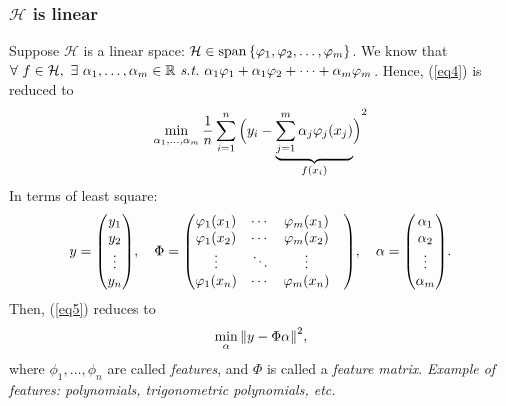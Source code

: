 \subsubsection*{$\mathcal{H}$ is linear}
Suppose $\mathcal{H}$ is a linear space: $\mathcal{H}\in\operatorname{span}\qty{\varphi_1,\varphi_2,\dots,\varphi_m}$. We know that $\forall\ f\in\mathcal{H},\ \exists\ \alpha_1,\dots,\alpha_m\in\R\st \alpha_1\phi_1+\alpha_1\phi_2+\cdots+\alpha_m\phi_m$. Hence, (\ref{eq4}) is reduced to \begin{equation}\label{eq5}\min_{\alpha_1,\dots,\alpha_m}\dfrac{1}{n}\sum_{i=1}^n\qty\Big(y_i-\underbrace{\sum_{j=1}^m\alpha_j\varphi_j(x_j)}_{f(x_i)})^2\end{equation} In terms of least square: \[y=\mqty(y_1\\y_2\\\vdots\\y_n), \quad\Phi=\mqty(\phi_1(x_1)&\cdots&\phi_m(x_1)\\\phi_1(x_2)&\cdots&\phi_m(x_2)\\\vdots&\ddots&\vdots&\\\phi_1(x_n)&\cdots&\phi_m(x_n)),\quad\alpha=\mqty(\alpha_1\\\alpha_2\\\vdots\\\alpha_m). \] Then, (\ref{eq5}) reduces to \begin{equation}\label{eq6}\min_\alpha\norm{y-\Phi\alpha}^2,\end{equation} where $\phi_1,\dots,\phi_n$ are called \textit{features}, and $\Phi$ is called a \textit{feature matrix}. \textit{Example of features: polynomials, trigonometric polynomials, etc.}

